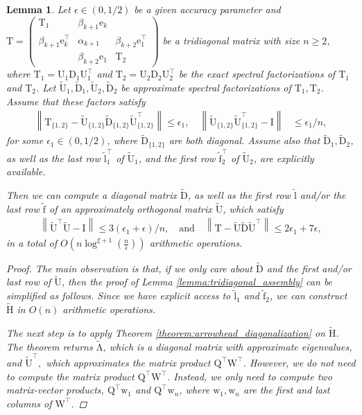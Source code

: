 \documentclass{article}
\newcommand{\lnorm}{\left\|}
\newcommand{\rnorm}{\right\|}
\newcommand{\lpar}{\left(}
\newcommand{\rpar}{\right)}
\newtheorem{lemma}{Lemma}[section]
\newcommand\vece{\boldsymbol{\mathrm{e}}}
\newcommand\vecw{\boldsymbol{\mathrm{w}}}
\newcommand\vecftilde{\widetilde{\boldsymbol{\mathrm{f}}}}
\newcommand\vecltilde{\widetilde{\boldsymbol{\mathrm{l}}}}
\newcommand\matD{\boldsymbol{\mathrm{D}}}
\newcommand\matI{\boldsymbol{\mathrm{I}}}
\newcommand\matQ{\boldsymbol{\mathrm{Q}}}
\newcommand\matT{\boldsymbol{\mathrm{T}}}
\newcommand\matU{\boldsymbol{\mathrm{U}}}
\newcommand\matW{\boldsymbol{\mathrm{W}}}
\newcommand\matDtilde{\widetilde{\boldsymbol{\mathrm{D}}}}
\newcommand\matHtilde{\widetilde{\boldsymbol{\mathrm{H}}}}
\newcommand\matUtilde{\widetilde{\boldsymbol{\mathrm{U}}}}
\newcommand\matLambdatilde{\widetilde{\boldsymbol{\mathrm{\Lambda}}}}
\newcommand{\cfmm}{\xi}
\begin{document}
\begin{lemma}
    \label{lemma:tridiagonal_assembly_eigenvalues_only}
Let $\epsilon\in(0,1/2)$ be a given accuracy parameter and $\matT = \begin{pmatrix}
    \matT_1 & \beta_{k+1}\vece_k & \\
    \beta_{k+1}\vece_k^\top & \alpha_{k+1} & \beta_{k+2}\vece_1^\top \\
     & \beta_{k+2}\vece_1 & \matT_2
\end{pmatrix}$ be a tridiagonal matrix with size $n\geq 2$, where $\matT_1=\matU_1\matD_1\matU_1^\top$ and $\matT_2=\matU_2\matD_2\matU_2^\top$ be the exact spectral factorizations of $\matT_1$ and $\matT_2$. Let $\matUtilde_1,\matDtilde_1,\matUtilde_2,\matDtilde_2$ be approximate spectral factorizations of $\matT_1,\matT_2$. Assume that these factors satisfy
    \begin{align*}
        \lnorm
            \matT_{\{1,2\}} - \matUtilde_{\{1,2\}}\matDtilde_{\{1,2\}}\matUtilde_{\{1,2\}}^\top
        \rnorm 
        \leq \epsilon_1,
        \quad
        \lnorm \matUtilde_{\{1,2\}}\matUtilde_{\{1,2\}}^\top -\matI \rnorm &\leq \epsilon_1/n,
    \end{align*}
    for some $\epsilon_1\in(0,1/2)$, where $\matDtilde_{\{1,2\}}$ are both diagonal. Assume also that $\matDtilde_1,\matDtilde_2$, as well as the last row $\vecltilde_1^\top$ of $\matUtilde_1$, and the first row $\vecftilde_2^\top$ of $\matUtilde_2$, are explicitly available. 
    
    Then we can compute a diagonal matrix $\matDtilde$, as well as the first row $\vecltilde$ and/or the last row $\vecftilde$ of an approximately orthogonal matrix $\matUtilde$, which satisfy
    \begin{align*}
        \lnorm\matUtilde^\top\matUtilde-\matI\rnorm\leq 3(\epsilon_1+\epsilon)/n,
        \quad \text{and} \quad
        \lnorm 
            \matT-\matUtilde\matDtilde\matUtilde^\top
        \rnorm \leq 2\epsilon_1+7\epsilon,
    \end{align*}
    in a total of $O\lpar n\log^{\cfmm+1}(\tfrac{n}{\epsilon})\rpar$ arithmetic operations.
    \begin{proof}
        The main observation is that, if we only care about $\matDtilde$ and the first and/or last row of $\matUtilde$, then the proof of Lemma \ref{lemma:tridiagonal_assembly} can be simplified as follows. Since we have explicit access to $\vecltilde_1$ and $\vecftilde_2$, we can construct $\matHtilde$ in $O(n)$ arithmetic operations.

        The next step is to apply Theorem \ref{theorem:arrowhead_diagonalization} on $\matHtilde$. The theorem returns $\matLambdatilde$, which is a diagonal matrix with approximate eigenvalues, and $\matUtilde^\top,$ which approximates the matrix product $\matQ^\top\matW^\top$. However, we do not need to compute the matrix product $\matQ^\top\matW^\top$. Instead, we only need to compute two matrix-vector products, $\matQ^\top\vecw_1$ and $\matQ^\top\vecw_n$, where $\vecw_1,\vecw_n$ are the first and last columns of $\matW^\top$.
    \end{proof}
\end{lemma}
\end{document}
